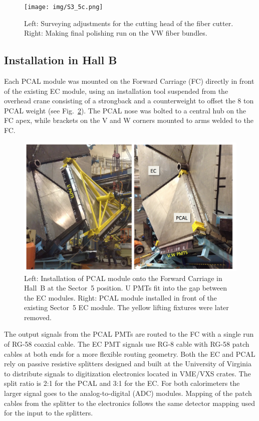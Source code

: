 \begin{figure}[hbt]
\centering
\texttt{[image: img/S3\_5c.png]}
\caption[Cutter 1]{Left: Surveying adjustments for the cutting head of the fiber cutter. Right: Making final polishing run on the VW fiber bundles.}
\label{fig:S3_5c}
\end{figure}

\subsection{Installation in Hall B}

Each PCAL module was mounted on the Forward Carriage (FC) directly in front of the existing EC module, using
an installation tool suspended from the overhead crane consisting of a strongback and a counterweight to offset
the 8 ton PCAL weight (see Fig.~\ref{fig:S5_1}). The PCAL nose was bolted to a central hub on the FC apex, while
brackets on the V and W corners mounted to arms welded to the FC.   

\begin{figure}[hbt]
\centering
\includegraphics[width=0.95\columnwidth,keepaspectratio]{img/S5_1.png}
\caption{Left: Installation of PCAL module onto the Forward Carriage in Hall~B at the Sector~5 position. U PMTs
  fit into the gap between the EC modules. Right: PCAL module installed in front of the existing Sector~5 EC
  module. The yellow lifting fixtures were later removed.}
\label{fig:S5_1}
\end{figure}

The output signals from the PCAL PMTs are routed to the FC with a single run of RG-58 coaxial cable. The EC PMT
signals use RG-8 cable with RG-58 patch cables at both ends for a more flexible routing geometry. Both the EC and
PCAL rely on passive resistive splitters designed and built at the University of Virginia to distribute signals to 
digitization electronics located in VME/VXS crates. The split ratio is 2:1 for the PCAL and 3:1 for the EC. For both calorimeters the larger signal goes to the analog-to-digital (ADC) modules. Mapping of the patch cables from the
splitter to the electronics follows the same detector mapping used for the input to the splitters.

